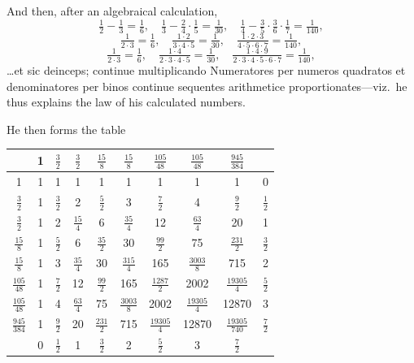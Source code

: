 \documentclass[11pt,a4paper]{article}
\begin{document}
And then, after an algebraical calculation,
\[
\tfrac{1}{2} - \tfrac{1}{3} = \tfrac{1}{6},\quad \tfrac{1}{3} - \tfrac{2}{4}\cdot\tfrac{1}{5} = \tfrac{1}{30},\quad \tfrac{1}{4} - \tfrac{3}{5}\cdot\tfrac{3}{6}\cdot\tfrac{1}{7} = \tfrac{1}{140},
\]
\[
\tfrac{1}{2\cdot 3} = \tfrac{1}{6},\quad \tfrac{1\cdot 2}{3\cdot 4\cdot 5} = \tfrac{1}{30},\quad \tfrac{1\cdot 2\cdot 3}{4\cdot 5\cdot 6\cdot 7} = \tfrac{1}{140},
\]
\[
\tfrac{1}{2\cdot 3} = \tfrac{1}{6},\quad \tfrac{1\cdot 4}{2\cdot 3\cdot 4\cdot 5} = \tfrac{1}{30},\quad \tfrac{1\cdot 4\cdot 9}{2\cdot 3\cdot 4\cdot 5\cdot 6\cdot 7} = \tfrac{1}{140},
\]
\ldots et sic deinceps; continue multiplicando Numeratores per numeros quadratos et denominatores per binos continue sequentes arithmetice proportionates---viz.\ he thus explains the law of his calculated numbers.

\smallskip
He then forms the table
\begin{center}
\renewcommand{\arraystretch}{1.25}
\begin{tabular}{|c|c|c|c|c|c|c|c|c|c|}
\hline
 & 1 & $\tfrac{3}{2}$ & $\tfrac{3}{2}$ & $\tfrac{15}{8}$ & $\tfrac{15}{8}$ & $\tfrac{105}{48}$ & $\tfrac{105}{48}$ & $\tfrac{945}{384}$ & \\
\hline
1 & 1 & 1 & 1 & 1 & 1 & 1 & 1 & 1 & 0\\
\hline
$\tfrac{3}{2}$ & 1 & $\tfrac{3}{2}$ & 2 & $\tfrac{5}{2}$ & 3 & $\tfrac{7}{2}$ & 4 & $\tfrac{9}{2}$ & $\tfrac{1}{2}$\\
\hline
$\tfrac{3}{2}$ & 1 & 2 & $\tfrac{15}{4}$ & 6 & $\tfrac{35}{4}$ & 12 & $\tfrac{63}{4}$ & 20 & 1\\
\hline
$\tfrac{15}{8}$ & 1 & $\tfrac{5}{2}$ & 6 & $\tfrac{35}{2}$ & 30 & $\tfrac{99}{2}$ & 75 & $\tfrac{231}{2}$ & $\tfrac{3}{2}$\\
\hline
$\tfrac{15}{8}$ & 1 & 3 & $\tfrac{35}{4}$ & 30 & $\tfrac{315}{4}$ & 165 & $\tfrac{3003}{8}$ & 715 & 2\\
\hline
$\tfrac{105}{48}$ & 1 & $\tfrac{7}{2}$ & 12 & $\tfrac{99}{2}$ & 165 & $\tfrac{1287}{2}$ & 2002 & $\tfrac{19305}{4}$ & $\tfrac{5}{2}$\\
\hline
$\tfrac{105}{48}$ & 1 & 4 & $\tfrac{63}{4}$ & 75 & $\tfrac{3003}{8}$ & 2002 & $\tfrac{19305}{4}$ & 12870 & 3\\
\hline
$\tfrac{945}{384}$ & 1 & $\tfrac{9}{2}$ & 20 & $\tfrac{231}{2}$ & 715 & $\tfrac{19305}{4}$ & 12870 & $\tfrac{19305}{740}$ & $\tfrac{7}{2}$\\
\hline
 & 0 & $\tfrac{1}{2}$ & 1 & $\tfrac{3}{2}$ & 2 & $\tfrac{5}{2}$ & 3 & $\tfrac{7}{2}$ & \\
\hline
\end{tabular}
\end{center}
\end{document}
